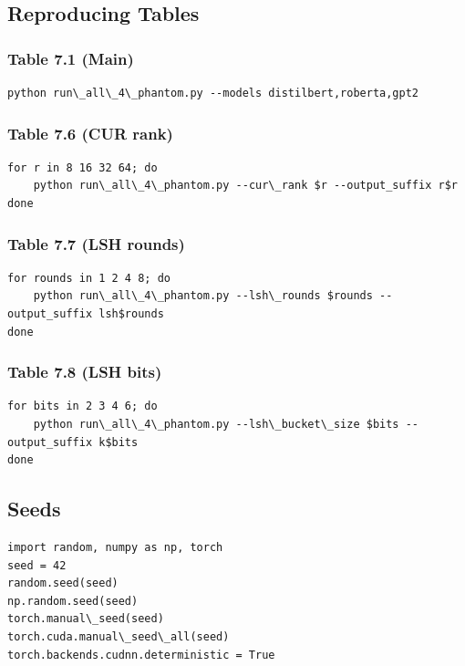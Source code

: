 \subsection{Reproducing Tables}

\subsubsection{Table 7.1 (Main)}

\begin{lstlisting}
python run\_all\_4\_phantom.py --models distilbert,roberta,gpt2
\end{lstlisting}

\subsubsection{Table 7.6 (CUR rank)}

\begin{lstlisting}
for r in 8 16 32 64; do
    python run\_all\_4\_phantom.py --cur\_rank $r --output_suffix r$r
done
\end{lstlisting}

\subsubsection{Table 7.7 (LSH rounds)}

\begin{lstlisting}
for rounds in 1 2 4 8; do
    python run\_all\_4\_phantom.py --lsh\_rounds $rounds --output_suffix lsh$rounds
done
\end{lstlisting}

\subsubsection{Table 7.8 (LSH bits)}

\begin{lstlisting}
for bits in 2 3 4 6; do
    python run\_all\_4\_phantom.py --lsh\_bucket\_size $bits --output_suffix k$bits
done
\end{lstlisting}

\subsection{Seeds}

\begin{lstlisting}
import random, numpy as np, torch
seed = 42
random.seed(seed)
np.random.seed(seed)
torch.manual\_seed(seed)
torch.cuda.manual\_seed\_all(seed)
torch.backends.cudnn.deterministic = True
\end{lstlisting}

